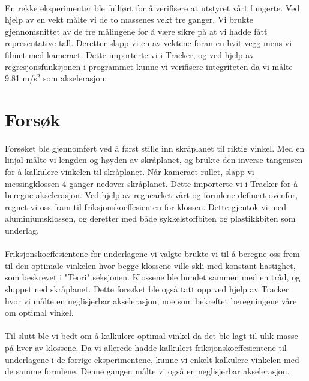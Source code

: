 \documentclass[10pt,a4paper]{report}
\begin{document}
\\En rekke eksperimenter ble fullført for å verifisere at utstyret vårt fungerte. Ved hjelp av en vekt målte vi de to massenes vekt tre ganger. Vi brukte gjennomsnittet av de tre målingene for å være sikre på at vi hadde fått representative tall. Deretter slapp vi en av vektene foran en hvit vegg mens vi filmet med kameraet. Dette importerte vi i Tracker, og ved hjelp av regresjonsfunksjonen i programmet kunne vi verifisere integriteten da vi målte 9.81 m/s$^2$ som akselerasjon.

\section*{Forsøk}
Forsøket ble gjennomført ved å først stille inn skråplanet til riktig vinkel. Med en linjal målte vi lengden og høyden av skråplanet, og brukte den inverse tangensen for å kalkulere vinkelen til skråplanet. Når kameraet rullet, slapp vi messingklossen 4 ganger nedover skråplanet. Dette importerte vi i Tracker for å beregne akselerasjon. Ved hjelp av regnearket vårt og formlene definert ovenfor, regnet vi oss fram til friksjonskoeffesienten for klossen. Dette gjentok vi med aluminiumsklossen, og deretter med både sykkelstoffbiten og plastikkbiten som underlag. \\
\\Friksjonskoeffesientene for underlagene vi valgte brukte vi til å beregne oss frem til den optimale vinkelen hvor begge klossene ville skli med konstant hastighet, som beskrevet i "Teori" seksjonen. Klossene ble bundet sammen med en tråd, og sluppet ned skråplanet. Dette forsøket ble også tatt opp ved hjelp av Tracker hvor vi målte en neglisjerbar akselerasjon, noe som bekreftet beregningene våre om optimal vinkel.\\
\\Til slutt ble vi bedt om å kalkulere optimal vinkel da det ble lagt til ulik masse på hver av klossene. Da vi allerede hadde kalkulert friksjonskoeffesientene til underlagene i de forrige eksperimentene, kunne vi enkelt kalkulere vinkelen med de samme formlene. Denne gangen målte vi også en neglisjerbar akselerasjon.
\end{document}
